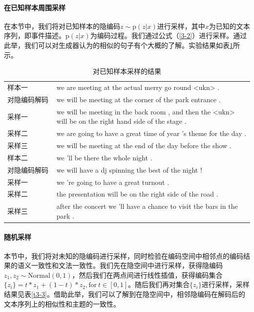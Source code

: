 \paragraph{在已知样本周围采样}  
在本节中，我们将对已知样本的隐编码$z \sim \mathrm{p}(z|x)$进行采样，其中$x$为已知的文本序列，即事件描述。$\mathrm{p}(z|x)$为编码过程。我们通过公式（\ref{3-2}）进行采样。通过此举，我们可以对生成器认为的相似的句子有个大概的了解。实验结果如表\ref{t3-2}所示。 
\begin{table}[htb]
    \center
    \caption{\label{t3-2}对已知样本采样的结果}
    \begin{tabular*}{\linewidth}{p{0.2\linewidth}p{0.8\linewidth}}
\toprule
样本一 & we are meeting at the actual merry go round <ukn> . \\
对隐编码解码 & we will be meeting at the corner of the park entrance .\\ 
采样一 & we will be meeting in the back room , and then the <ukn> will be on the right hand side of the stage .\\
采样二 & we are going to have a great time of year 's theme for the day . \\
采样三 & we will be meeting at the end of the day before the show . \\
\midrule
样本二 & we 'll be there the whole night . \\
对隐编码解码 & we will have a dj spinning the best of the night !\\ 
采样一 & we 're going to have a great turnout .\\
采样二 & the presentation will be on the right side of the road .\\
采样三 & after the concert we 'll have a chance to visit the bars in the park . \\
\bottomrule
    \end{tabular*}
\end{table}
\paragraph{随机采样}
本节中，我们将对未知的隐编码进行采样，同时检验在编码空间中相邻点的编码结果的语义一致性和文法一致性。我们先在隐空间中进行采样，获得隐编码$z_1,z_2 \sim \mathrm{Normal}(0,1)$，然后我们在两点间进行线性插值，获得编码集合$\{z_i\} = t*z_1+(1-t)*z_2 ,\mathrm{for}\ t \in [0,1]$。随后我们再对集合$\{z_i\}$进行采样，采样结果见表\ref{t3-3}。借助此举，我们可以了解到在隐空间中，相邻隐编码在解码后的文本序列上的相似性和主题的一致性。 

